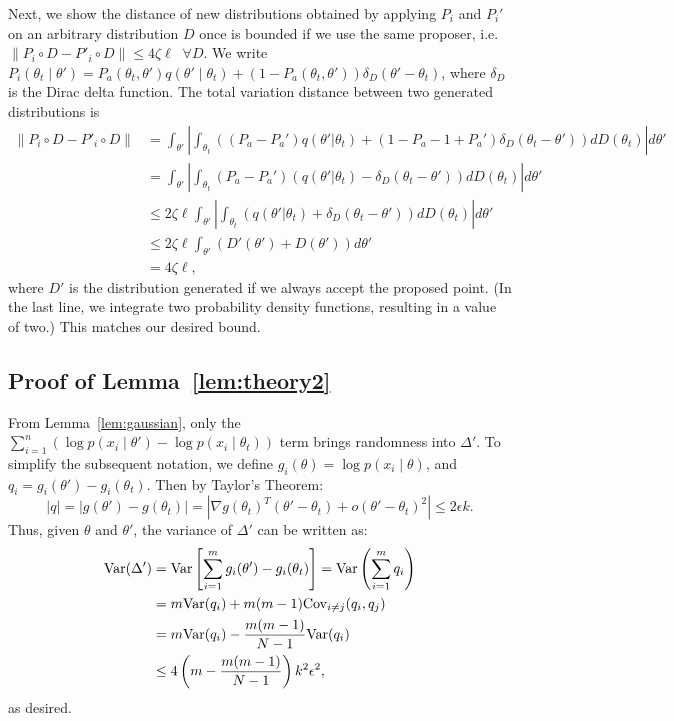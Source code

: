 \documentclass{article}
\begin{document}
Next, we show the distance of new distributions obtained by applying $P_i$ and $P_i'$ on an
arbitrary distribution $D$ once is bounded if we use the same proposer, i.e.  $\|P_i\circ D -
P'_i\circ D\| \leq 4\zeta \ell \;\; \forall D$. We write $P_i(\theta_t \mid \theta') = P_a(\theta_t, \theta')
q(\theta'\mid \theta_t) + (1-P_a(\theta_t,\theta')) \delta_D(\theta' - \theta_t)$, where $\delta_D$
is the Dirac delta function. The total variation distance between two generated distributions is
\begin{align*}
\|P_i\circ D - P'_i\circ D\| &= \int_{\theta'} \left| \int_{\theta_t}((P_a-P_a') q(\theta'|\theta_t) + (1-P_a - 1+P_a') \delta_D(\theta_t -\theta')) dD(\theta_t) \right| d\theta' \\
&= \int_{\theta'} \left| \int_{\theta_t} (P_a- P_a')(q(\theta'|\theta_t) - \delta_D(\theta_t - \theta')) dD(\theta_t) \right|  d\theta'\\ 
&\leq 2 \zeta \ell \int_{\theta'} \left| \int_{\theta_t}(q(\theta'|\theta_t) + \delta_D(\theta_t - \theta')) dD(\theta_t) \right| d\theta'\\
&\leq 2 \zeta \ell \int_{\theta'} ( D'(\theta') + D(\theta') ) d\theta'\\
&= 4 \zeta \ell,
\end{align*}
where $D'$ is the distribution generated if we always accept the proposed point. (In the last line,
we integrate two probability density functions, resulting in a value of two.) This matches our
desired bound.

\subsection{Proof of Lemma~\ref{lem:theory2}}\label{app:theory2}

From Lemma~\ref{lem:gaussian}, only the $\sum_{i=1}^n (\log p(x_i\mid \theta') - \log p(x_i\mid
\theta_t))$ term brings randomness into $\Delta'$. To simplify the subsequent notation, we define
$g_i(\theta) = \log p(x_i\mid \theta)$, and $q_i = g_i(\theta') - g_i(\theta_t)$. Then by Taylor's Theorem:
\[
|q| = |g(\theta') - g(\theta_t)| = |\nabla g(\theta_t)^T(\theta' - \theta_t) + o(\theta' - \theta_t)^2| \leq 2\epsilon k.
\]
Thus, given $\theta$ and $\theta'$, the variance of $\Delta'$ can be written as:
\begin{align*}
{\rm Var}(\Delta') &= {\rm Var}\left[\sum_{i=1}^m g_i(\theta') - g_i(\theta_t)\right] = {\rm Var}\left(\sum_{i=1}^m q_i\right) \\
&= m {\rm Var} (q_i) + m(m-1) {\rm Cov}_{i \neq j}(q_i,q_j) \\
&= m{\rm Var}(q_i) - \frac{m(m-1)}{N-1} {\rm Var}(q_i) \\
&\leq 4\left(m - \frac{m(m-1)}{N-1}\right)k^2 \epsilon^2,
\end{align*}
as desired.
\end{document}
